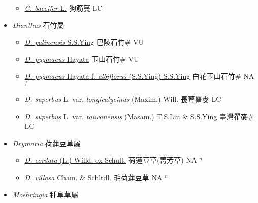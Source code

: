 \begin{itemize}
  \begin{itemize}
        \item[] \href{http://www.theplantlist.org/tpl1.1/search?q=Cucubalus+baccifer}{\textit{C. baccifer} L.}   狗筋蔓 LC
  \end{itemize}
 \item[] \textit{Dianthus} 石竹屬
                    
  \begin{itemize}
        \item[] \href{http://www.theplantlist.org/tpl1.1/search?q=Dianthus+palinensis}{\textit{D. palinensis} S.S.Ying}   巴陵石竹\# VU
        \item[] \href{http://www.theplantlist.org/tpl1.1/search?q=Dianthus+pygmaeus}{\textit{D. pygmaeus} Hayata}   玉山石竹\# VU
        \item[] \href{http://www.theplantlist.org/tpl1.1/search?q=Dianthus+pygmaeus+ f. +albiflorus}{\textit{D. pygmaeus} Hayata  f.  \textit{albiflorus} (S.S.Ying) S.S.Ying}   白花玉山石竹\# NA $^f$
        \item[] \href{http://www.theplantlist.org/tpl1.1/search?q=Dianthus+superbus+var.+longicalycinus}{\textit{D. superbus} L. var. \textit{longicalycinus} (Maxim.) Will.}   長萼瞿麥 LC
        \item[] \href{http://www.theplantlist.org/tpl1.1/search?q=Dianthus+superbus+var.+taiwanensis}{\textit{D. superbus} L. var. \textit{taiwanensis} (Masam.) T.S.Liu \& S.S.Ying}   臺灣瞿麥\# LC
  \end{itemize}
 \item[] \textit{Drymaria} 荷蓮豆草屬
                    
  \begin{itemize}
        \item[] \href{http://www.theplantlist.org/tpl1.1/search?q=Drymaria+cordata}{\textit{D. cordata} (L.) Willd. ex Schult.}     荷蓮豆草(菁芳草)   NA $^n$
        \item[] \href{http://www.theplantlist.org/tpl1.1/search?q=Drymaria+villosa}{\textit{D. villosa} Cham. \& Schltdl.}   毛荷蓮豆草 NA $^n$
  \end{itemize}
 \item[] \textit{Moehringia} 種阜草屬
                    

\end{itemize}
